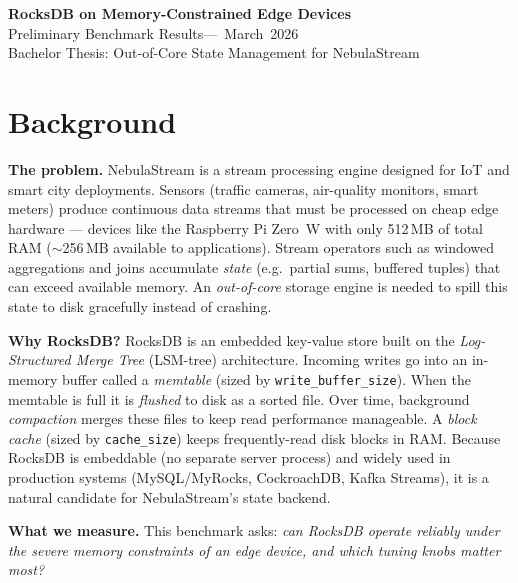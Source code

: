 \documentclass[10pt,a4paper]{scrartcl}
\begin{document}
\begin{center}
  {\Large\bfseries\color{headerblue} RocksDB on Memory-Constrained Edge Devices}\\[5pt]
  {\normalsize Preliminary Benchmark Results\enspace---~March~2026}\\[2pt]
  {\small\color{footergray} Bachelor Thesis: Out-of-Core State Management for NebulaStream}
\end{center}
\vspace{-1mm}

\section{Background}

\textbf{The problem.}\enspace
NebulaStream is a stream processing engine designed for IoT and smart city
deployments. Sensors (traffic cameras, air-quality monitors, smart meters)
produce continuous data streams that must be processed on cheap edge hardware
--- devices like the Raspberry Pi Zero~W with only 512\,MB of total RAM
($\sim$256\,MB available to applications). Stream operators such as windowed
aggregations and joins accumulate \emph{state} (e.g.\ partial sums, buffered
tuples) that can exceed available memory. An \emph{out-of-core} storage engine
is needed to spill this state to disk gracefully instead of crashing.

\textbf{Why RocksDB?}\enspace
RocksDB is an embedded key-value store built on the \emph{Log-Structured Merge
Tree} (LSM-tree) architecture. Incoming writes go into an in-memory buffer
called a \emph{memtable} (sized by \texttt{write\_buffer\_size}). When the
memtable is full it is \emph{flushed} to disk as a sorted file. Over time,
background \emph{compaction} merges these files to keep read performance
manageable. A \emph{block cache} (sized by \texttt{cache\_size}) keeps
frequently-read disk blocks in RAM. Because RocksDB is embeddable (no separate
server process) and widely used in production systems (MySQL/MyRocks, CockroachDB,
Kafka Streams), it is a natural candidate for NebulaStream's state backend.

\textbf{What we measure.}\enspace
This benchmark asks: \emph{can RocksDB operate reliably under the severe memory
constraints of an edge device, and which tuning knobs matter most?}

\end{document}
